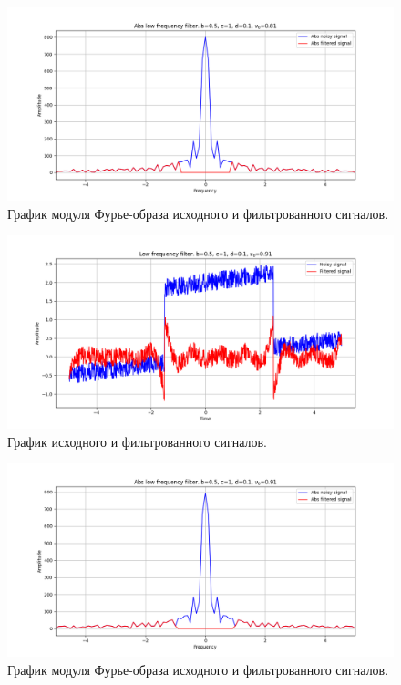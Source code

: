 \documentclass[a4paper, 12pt]{article}
\begin{document}
    \begin{figure}[!htb]
        \centering
        \includegraphics[scale=0.485]{8_abs_u_U_nolow.png}
        \captionsetup{skip=0pt}
        \caption{График модуля Фурье-образа исходного и фильтрованного сигналов.}
        \label{fig:fig42}
    \end{figure}
    \begin{figure}[!htb]
        \centering
        \includegraphics[scale=0.485]{9_u_flt_u_nolow.png}
        \captionsetup{skip=0pt}
        \caption{График исходного и фильтрованного сигналов.}
        \label{fig:fig43}
    \end{figure}
    \begin{figure}[!htb]
        \centering
        \includegraphics[scale=0.485]{9_abs_u_U_nolow.png}
        \captionsetup{skip=0pt}
        \caption{График модуля Фурье-образа исходного и фильтрованного сигналов.}
        \label{fig:fig44}
    \end{figure}
\end{document}
